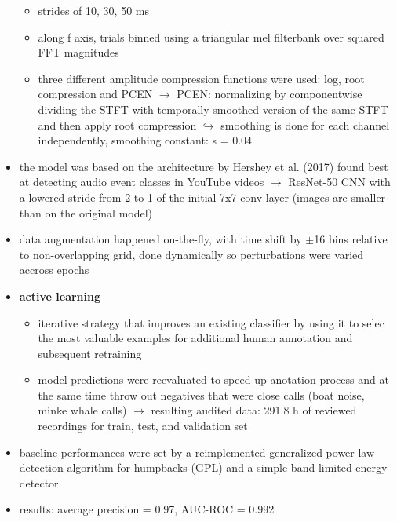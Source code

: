 \documentclass[12pt,a4paper]{article}
\begin{document}
\begin{itemize}
\begin{itemize}
    \item strides of 10, 30, 50 ms
    \item along f axis, trials binned using a triangular mel filterbank over squared FFT magnitudes
    \item three different amplitude compression functions were used: log, root compression and PCEN
    \newline \indent $\longrightarrow$ PCEN: normalizing by componentwise dividing the STFT with temporally smoothed version of the same STFT and then apply root compression
    \newline \indent $\hookrightarrow$ smoothing is done for each channel independently, smoothing constant: s = 0.04
  \end{itemize}
  \item the model was based on the architecture by Hershey et al. (2017) found best at detecting audio event classes in YouTube videos
  \newline \indent $\longrightarrow$ ResNet-50 CNN with a lowered stride from 2 to 1 of the initial 7x7 conv layer (images are smaller than on the original model)
  \item data augmentation happened on-the-fly, with time shift by $\pm$16 bins relative to non-overlapping grid, done dynamically so perturbations were varied accross epochs
  \item \textbf{active learning}
  \begin{itemize}
    \item iterative strategy that improves an existing classifier by using it to selec the most valuable examples for additional human annotation and subsequent retraining
    \item model predictions were reevaluated to speed up anotation process and at the same time throw out negatives that were close calls (boat noise, minke whale calls)
    \newline \indent $\longrightarrow$ resulting audited data: 291.8 h of reviewed recordings for train, test, and validation set
  \end{itemize}
  \item baseline performances were set by a reimplemented generalized power-law detection algorithm for humpbacks (GPL) and a simple band-limited energy detector
  \item results: average precision = 0.97, AUC-ROC = 0.992
\end{itemize}
\end{document}
